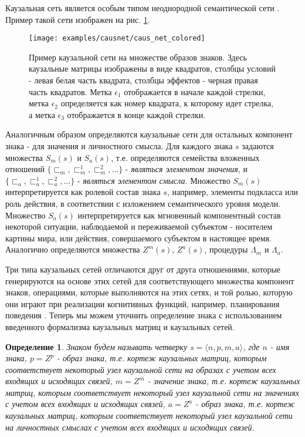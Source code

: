 \documentclass[12pt]{scrartcl}
\newtheorem{definition}{Определение}
\begin{document}
	Каузальная сеть является особым типом неоднородной семантической сети \cite{Osipov1990}. Пример такой сети изображен на рис. \ref{fig:caus_net}.

	\begin{figure}
		\centering
		\texttt{[image: examples/causnet/caus\_net\_colored]}
		\caption{Пример каузальной сети на множестве образов знаков. Здесь каузальные матрицы изображены в виде квадратов, столбцы условий - левая белая часть квадрата, столбцы эффектов - черная правая часть квадратов. Метка $\epsilon_1$ отображается в начале каждой стрелки, метка $\epsilon_2$ определяется как номер квадрата, к которому идет стрелка, а метка $\epsilon_3$ отображается в конце каждой стрелки.}
		\label{fig:caus_net}		
	\end{figure}
		
	Аналогичным образом определяются каузальные сети для остальных компонент знака - для значения и личностного смысла. Для каждого знака $s$ задаются множества $S_m(s)$ и $S_a(s)$, т.е. определяются семейства вложенных отношений $\{\sqsubset_m,\sqsubset_m^1,\sqsubset_m^2,\dots\}$ - \textit{являться элементом значения}, и $\{\sqsubset_a,\sqsubset_a^1,\sqsubset_a^2,\dots\}$ - \textit{являться элементом смысла}. Множество $S_m(s)$ интерпретируется как ролевой состав знака $s$, например, элементы подкласса или роль действия, в соответствии с изложением семантического уровня модели. Множество $S_a(s)$ интерпретируется как мгновенный компонентный состав некоторой ситуации, наблюдаемой и переживаемой субъектом - носителем картины мира, или действия, совершаемого субъектом в настоящее время. Аналогично определяются множества $Z^m(s)$, $Z^a(s)$, процедуры $\Lambda_m$ и $\Lambda_a$.
	
	Три типа каузальных сетей отличаются друг от друга отношениями, которые генерируются на основе этих сетей для соответствующего множества компонент знаков, операциями, которые выполняются на этих сетях, и той ролью, которую они играют при реализации когнитивных функций, например, планирования поведения \cite{Osipov2015d,Panov2017a}. Теперь мы можем уточнить определение знака \cite{Osipov2015c} с использованием введенного формализма каузальных матриц и каузальных сетей.
	
	\begin{definition}
		Знаком будем называть четверку $s=\langle n, p, m, a \rangle$, где $n$ - имя знака, $p=Z^p$ - образ знака, т.е. кортеж каузальных матриц, которым соответствует некоторый узел каузальной сети на образах с учетом всех входящих и исходящих связей, $m=Z^m$ - значение знака, т.е. кортеж каузальных матриц, которым соответствует некоторый узел каузальной сети на значениях  с учетом всех входящих и исходящих связей, $a=Z^a$ - образ знака, т.е. кортеж каузальных матриц, которым соответствует некоторый узел каузальной сети на личностных смыслах  с учетом всех входящих и исходящих связей.
	\end{definition}
	
\end{document}

